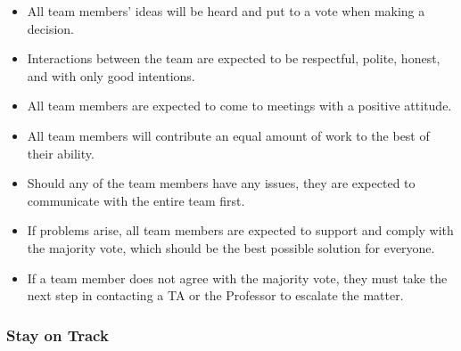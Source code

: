 \documentclass{article}
\begin{document}
\begin{itemize}
    \item All team members’ ideas will be heard and put to a vote when making a decision.
    \item Interactions between the team are expected to be respectful, polite, honest, and with only good intentions.
    \item All team members are expected to come to meetings with a positive attitude.
    \item All team members will contribute an equal amount of work to the best of their ability.
    \item Should any of the team members have any issues, they are expected to communicate with the entire team first.
    \item If problems arise, all team members are expected to support and comply with the majority vote, which should be the best possible solution for everyone.
    \item If a team member does not agree with the majority vote, they must take the next step in contacting a TA or the Professor to escalate the matter.
\end{itemize}

\subsubsection*{Stay on Track}



\end{document}
